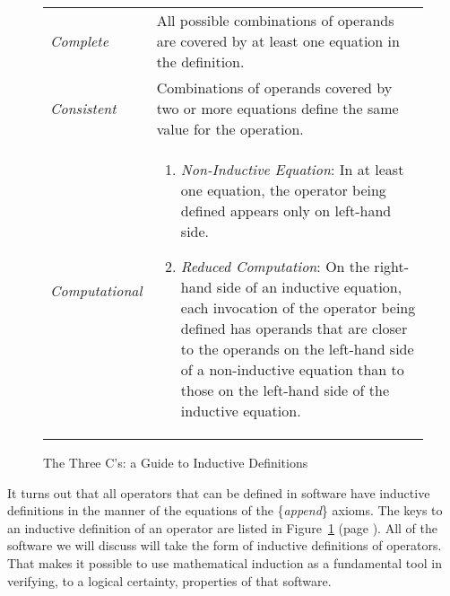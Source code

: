 \begin{figure}
\begin{center}
\begin{tabular}{lp{3.5in}}
\emph{Complete} & All possible combinations of operands are covered by at least one equation in the definition. \\
\emph{Consistent} & Combinations of operands covered by two or more equations define the same value for the operation. \\
\emph{Computational} &
\begin{enumerate}
\item \emph{Non-Inductive Equation}: In at least one equation,
the operator being defined appears only on left-hand side.
\item \emph{Reduced Computation}:
\index{three C's}\index{definition!inductive (circular)}On the right-hand side of an inductive equation,
each invocation of the operator being defined has operands that
are closer to the operands on the left-hand side of a non-inductive equation
than to those on the left-hand side of the inductive equation.
\end{enumerate}
\end{tabular}
\end{center}
\caption{The Three C's: a Guide to Inductive Definitions}
\label{fig:inductive-def-keys}
\end{figure}

It turns out that all operators that can be defined in
software
have inductive definitions in the manner of the equations
of the \{\emph{append}\} axioms.
The keys to an inductive definition of an operator are  listed in
Figure~\ref{fig:inductive-def-keys} (page \pageref{fig:inductive-def-keys}).
All of the software we will discuss will take the form of
inductive definitions of operators.
That makes it possible to use mathematical induction as
a fundamental tool in verifying, to a logical certainty,
properties of that software.

